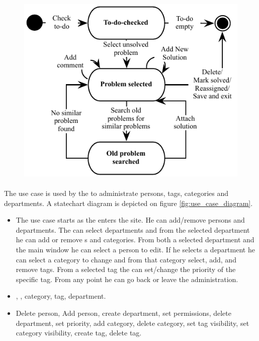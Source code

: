 \begin{figure}[htbp]
\begin{center}
 \includegraphics[scale=0.8]{input/application_domain_analysis/solve_problem_use_case}
\label{fig:solve_problem_use_case}
\end{center}
\end{figure}


\paragraph{\tucadmin[c]} The use case \tucadmin[] is used by the \sadmin[] to administrate persons, tags, categories and departments. A statechart diagram is depicted on figure \ref{fig:use_case_diagram}.

\begin{itemize}
\item{} The use case starts as the \sadmin{} enters the site. He can add/remove persons and departments. The \sadmin{} can select departments and from the selected department he can add or remove \staff[]s and categories. From both a selected department and the main window he can select a person to edit. 
If he selects a department he can select a category to change and from that category select, add, and remove tags. 
From a selected tag the \sadmin{} can set/change the priority of the specific tag. From any point he can go back or leave the administration. 

\item{} \staff[c], \client[c], category, tag, department.

\item{} Delete person, Add person, create department, set permissions, delete department, set priority, add category, delete category, set tag visibility, set category visibility, create tag, delete tag.
\end{itemize}




